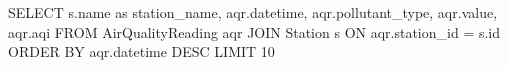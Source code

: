 SELECT 
    s.name as station_name,
    aqr.datetime,
    aqr.pollutant_type,
    aqr.value,
    aqr.aqi
FROM AirQualityReading aqr
JOIN Station s ON aqr.station_id = s.id
ORDER BY aqr.datetime DESC
LIMIT 10
